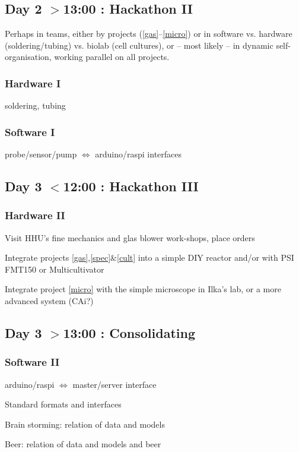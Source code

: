 \documentclass[12pt,a4paper]{article}
\begin{document}
\subsection{Day 2 $>$13:00 : Hackathon II}

Perhaps in teams, either by projects (\ref{gas}--\ref{micro}) or in
software vs. hardware (soldering/tubing) vs. biolab (cell cultures),
or -- most likely -- in dynamic self-organisation, working parallel on
all projects.

\subsubsection{Hardware I} 
soldering, tubing

\subsubsection{Software I} 
probe/sensor/pump $\Leftrightarrow$ arduino/raspi interfaces

\subsection{Day 3 $<$12:00 : Hackathon III}

\subsubsection{Hardware II} 
Visit HHU's fine mechanics and glas blower work-shops, place orders

Integrate projects \ref{gas},\ref{spec}\&\ref{cult} into a simple DIY
reactor and/or with PSI FMT150 or Multicultivator

Integrate project \ref{micro} with the simple microscope in Ilka's lab,
or a more advanced system (CAi?)

\subsection{Day 3 $>$13:00 : Consolidating}

\subsubsection{Software II}
arduino/raspi $\Leftrightarrow$  master/server interface

Standard formats and interfaces

Brain storming: relation of data and models

Beer: relation of data and models and beer
\end{document}
